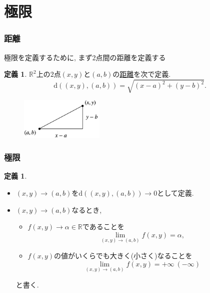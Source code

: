 \documentclass[dvipdfmx,cjk,10.2pt]{beamer}
\newcommand{\R}{\mathbb{R}}
\theoremstyle{definition}
\newtheorem{Def}[Thm]{定義}
\begin{document}

\section{極限}


\begin{frame}
\frametitle{距離}

極限を定義するために, まず2点間の距離を定義する

\begin{Def}
$\R^2$上の$2$点$(x,y)$と$(a,b)$の\underline{距離}を次で定義. 
$$
\mathrm{d}((x,y),(a,b))=\sqrt{(x-a)^2+(y-b)^2}. 
$$
\end{Def}

\vspace{-2mm}

\begin{figure}[htbp]
 \begin{center} 
  \includegraphics[width=40mm]{dist.png}
 \end{center}
\end{figure}

\vspace{-2mm}

\end{frame}




\begin{frame}
\frametitle{極限}


\begin{Def} \label{極限}
\begin{itemize}
\item $(x,y) \to (a,b)$を$\mathrm{d}((x,y),(a,b)) \to 0$として定義. 
\item $(x,y) \to (a,b)$なるとき, 
 \begin{itemize}
 \item $f(x,y)\to \alpha \in \R$であることを
$$
\lim_{(x,y)\to (a,b)}f(x,y)=\alpha, 
$$
\item  $f(x,y)$の値がいくらでも大きく(小さく)なることを
$$
\lim_{(x,y)\to (a,b)}f(x,y)=+ \infty \ (-\infty)
$$
\end{itemize}
と書く. 
\end{itemize}
\end{Def}

\end{frame}
\end{document}
